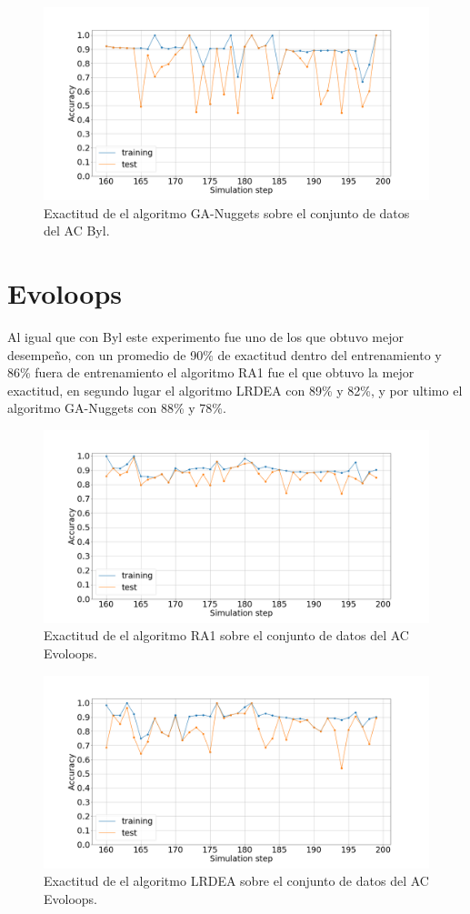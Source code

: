 \begin{figure}[H]
	\centering
	\includegraphics[width=\linewidth]{fig/GA-nuggets_5}
	\caption{Exactitud de el algoritmo GA-Nuggets sobre el conjunto de datos del AC Byl.}
	\label{fig:ganuggetsabyl}
\end{figure}

\section{Evoloops}
Al igual que con Byl este experimento fue uno de los que obtuvo mejor desempeño, con un promedio de 90\% de exactitud dentro del entrenamiento y 86\% fuera de entrenamiento el algoritmo RA1 fue el que obtuvo la mejor exactitud, en segundo lugar el algoritmo LRDEA con 89\% y 82\%, y por ultimo el algoritmo GA-Nuggets con 88\% y 78\%.
\begin{figure}[H]
	\centering
	\includegraphics[width=\linewidth]{fig/ra1_6}
	\caption{Exactitud de el algoritmo RA1 sobre el conjunto de datos del AC Evoloops.}
	\label{fig:ra1evoloops}
\end{figure}
\begin{figure}[H]
	\centering
	\includegraphics[width=\linewidth]{fig/LRDEA_7}
	\caption{Exactitud de el algoritmo LRDEA sobre el conjunto de datos del AC Evoloops.}
	\label{fig:lrdeaevoloops}
\end{figure}

